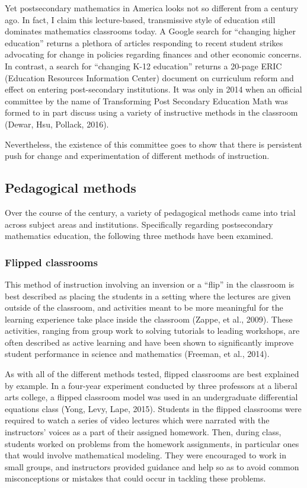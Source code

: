 Yet postsecondary mathematics in America looks not so different from a century ago. In fact, I claim this lecture-based, transmissive style of education still dominates mathematics classrooms today. A Google search for ``changing higher education'' returns a plethora of articles responding to recent student strikes advocating for change in policies regarding finances and other economic concerns. In contrast, a search for ``changing K-12 education'' returns a 20-page ERIC (Education Resources Information Center) document on curriculum reform and effect on entering post-secondary institutions. It was only in 2014 when an official committee by the name of Transforming Post Secondary Education Math was formed to in part discuss using a variety of instructive methods in the classroom (Dewar, Hsu, Pollack, 2016).

Nevertheless, the existence of this committee goes to show that there is persistent push for change and experimentation of different methods of instruction.
\subsection{Pedagogical methods}
Over the course of the century, a variety of pedagogical methods came into trial across subject areas and institutions. Specifically regarding postsecondary mathematics education, the following three methods have been examined.

\subsubsection{Flipped classrooms}
This method of instruction involving an inversion or a ``flip'' in the classroom is best described as placing the students in a setting where the lectures are given outside of the classroom, and activities meant to be more meaningful for the learning experience take place inside the classroom (Zappe, et al., 2009). These activities, ranging from group work to solving tutorials to leading workshops, are often described as active learning and have been shown to significantly improve student performance in science and mathematics (Freeman, et al., 2014).

As with all of the different methods tested, flipped classrooms are best explained by example. In a four-year experiment conducted by three professors at a liberal arts college, a flipped classroom model was used in an undergraduate differential equations class (Yong, Levy, Lape, 2015). Students in the flipped classrooms were required to watch a series of video lectures which were narrated with the instructors' voices as a part of their assigned homework. Then, during class, students worked on problems from the homework assignments, in particular ones that would involve mathematical modeling. They were encouraged to work in small groups, and instructors provided guidance and help so as to avoid common misconceptions or mistakes that could occur in tackling these problems.


